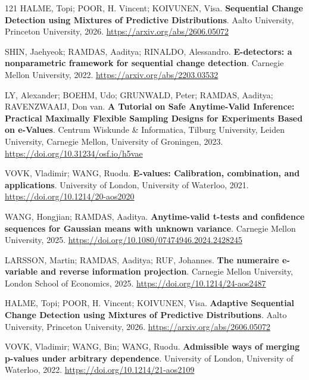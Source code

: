 \begin{thebibliography}{121}
  HALME, Topi; POOR, H. Vincent; KOIVUNEN, Visa.
  \newblock \textbf{Sequential Change Detection using Mixtures of Predictive Distributions}.
  \newblock Aalto University, Princeton University, 2026.
  \newblock \url{https://arxiv.org/abs/2606.05072}

  SHIN, Jaehyeok; RAMDAS, Aaditya; RINALDO, Alessandro.
  \newblock \textbf{E-detectors: a nonparametric framework for sequential change detection}.
  \newblock Carnegie Mellon University, 2022.
  \newblock \url{https://arxiv.org/abs/2203.03532}

  LY, Alexander; BOEHM, Udo; GRUNWALD, Peter; RAMDAS, Aaditya; RAVENZWAAIJ, Don van.
  \newblock \textbf{A Tutorial on Safe Anytime-Valid Inference: Practical Maximally Flexible Sampling Designs for Experiments Based on e-Values}.
  \newblock Centrum Wiskunde \& Informatica, Tilburg University, Leiden University, Carnegie Mellon, University of Groningen, 2023.
  \newblock \url{https://doi.org/10.31234/osf.io/h5vae}

  VOVK, Vladimir; WANG, Ruodu.
  \newblock \textbf{E-values: Calibration, combination, and applications}.
  \newblock University of London, University of Waterloo, 2021.
  \newblock \url{https://doi.org/10.1214/20-aos2020}

  WANG, Hongjian; RAMDAS, Aaditya.
  \newblock \textbf{Anytime-valid t-tests and confidence sequences for Gaussian means with unknown variance}.
  \newblock Carnegie Mellon University, 2025.
  \newblock \url{https://doi.org/10.1080/07474946.2024.2428245}

  LARSSON, Martin; RAMDAS, Aaditya; RUF, Johannes.
  \newblock \textbf{The numeraire e-variable and reverse information projection}.
  \newblock Carnegie Mellon University, London School of Economics, 2025.
  \newblock \url{https://doi.org/10.1214/24-aos2487}

  HALME, Topi; POOR, H. Vincent; KOIVUNEN, Visa.
  \newblock \textbf{Adaptive Sequential Change Detection using Mixtures of Predictive Distributions}.
  \newblock Aalto University, Princeton University, 2026.
  \newblock \url{https://arxiv.org/abs/2606.05072}

  VOVK, Vladimir; WANG, Bin; WANG, Ruodu.
  \newblock \textbf{Admissible ways of merging p-values under arbitrary dependence}.
  \newblock University of London, University of Waterloo, 2022.
  \newblock \url{https://doi.org/10.1214/21-aos2109}


\end{thebibliography}
